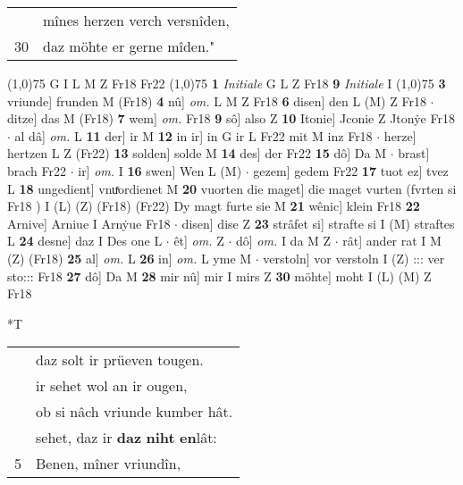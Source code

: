 \documentclass[8pt,a4paper,notitlepage]{article}
\begin{document}
\begin{table}[ht]
\begin{minipage}[t]{0.5\linewidth}
\begin{tabular}{rl}
 & mînes herzen verch versnîden,\\ 
30 & daz möhte er gerne mîden."\\ 
\end{tabular}
\scriptsize
\line(1,0){75} \newline
G I L M Z Fr18 Fr22 \newline
\line(1,0){75} \newline
\textbf{1} \textit{Initiale} G L Z Fr18  \textbf{9} \textit{Initiale} I  \newline
\line(1,0){75} \newline
\textbf{3} vriunde] frunden M (Fr18) \textbf{4} nû] \textit{om.} L M Z Fr18 \textbf{6} disen] den L (M) Z Fr18  $\cdot$ ditze] das M (Fr18) \textbf{7} wem] \textit{om.} Fr18 \textbf{9} sô] also Z \textbf{10} Itonie] Jconie Z Jtonẏe Fr18  $\cdot$ al dâ] \textit{om.} L \textbf{11} der] ir M \textbf{12} in ir] in G ir L Fr22 mit M inz Fr18  $\cdot$ herze] hertzen L Z (Fr22) \textbf{13} solden] solde M \textbf{14} des] der Fr22 \textbf{15} dô] Da M  $\cdot$ brast] brach Fr22  $\cdot$ ir] \textit{om.} I \textbf{16} swen] Wen L (M)  $\cdot$ gezem] gedem Fr22 \textbf{17} tuot ez] tvez L \textbf{18} ungedient] vnuͯordienet M \textbf{20} vuorten die maget] die maget vurten (fvrten si Fr18 ) I (L) (Z) (Fr18) (Fr22) Dy magt furte sie M \textbf{21} wênic] klein Fr18 \textbf{22} Arnive] Arniue I Arnẏue Fr18  $\cdot$ disen] dise Z \textbf{23} strâfet si] strafte si I (M) straftes L \textbf{24} desne] daz I Des one L  $\cdot$ êt] \textit{om.} Z  $\cdot$ dô] \textit{om.} I da M Z  $\cdot$ rât] ander rat I M (Z) (Fr18) \textbf{25} al] \textit{om.} L \textbf{26} in] \textit{om.} L yme M  $\cdot$ verstoln] vor verstoln I (Z) ::: ver sto::: Fr18 \textbf{27} dô] Da M \textbf{28} mir nû] mir I mirs Z \textbf{30} möhte] moht I (L) (M) Z Fr18 \newline
\end{minipage}
\hspace{0.5cm}
\begin{minipage}[t]{0.5\linewidth}
\small
\begin{center}*T
\end{center}
\begin{tabular}{rl}
 & daz solt ir prüeven tougen.\\ 
 & ir sehet wol an ir ougen,\\ 
 & ob si nâch vriunde kumber hât.\\ 
 & sehet, daz ir \textbf{daz} \textbf{niht} \textbf{en}lât:\\ 
5 & Benen, mîner vriundîn,\\ 

\end{tabular}
\end{minipage}
\end{table}
\end{document}
